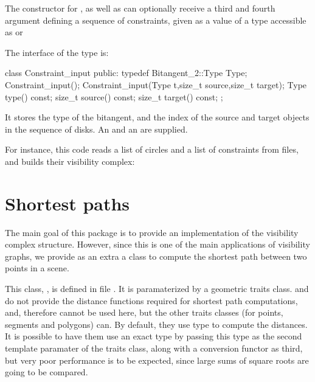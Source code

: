 The constructor for , as well as
 can optionally
receive a third and fourth argument defining a sequence of
constraints, given as a value of a type accessible as
 or 

The interface of the  type is:
\begin{ccExampleCode}
class Constraint_input {
public:
  typedef Bitangent_2::Type Type;
  Constraint_input();
  Constraint_input(Type t,size_t source,size_t target);
  Type type() const;
  size_t source() const;
  size_t target() const;
};
\end{ccExampleCode}
It stores the type of the bitangent, and the index of the source and target
objects in the sequence of disks. An  and an  are supplied.

For instance, this code reads a list of circles and a list of constraints
from files, and builds their visibility complex:

\section{Shortest paths}

The main goal of this package is to provide an implementation of the
visibility complex structure. However, since this is one of the main
applications of visibility graphs, we provide as an extra a class to
compute the shortest path between two points in a scene. 

This class, , is defined in file
. It is paramaterized by a geometric traits
class.  and
  do not provide the
distance functions required for shortest path computations, and, therefore
cannot be used here, but the other traits classes (for points, segments and
polygons) can. By default, they use type  to compute the
distances. It is possible to have them use an exact type by passing this
type as the second template paramater of the traits class, along with a
conversion functor as third, but very poor performance is to be expected,
since large sums of square roots are going to be compared.

